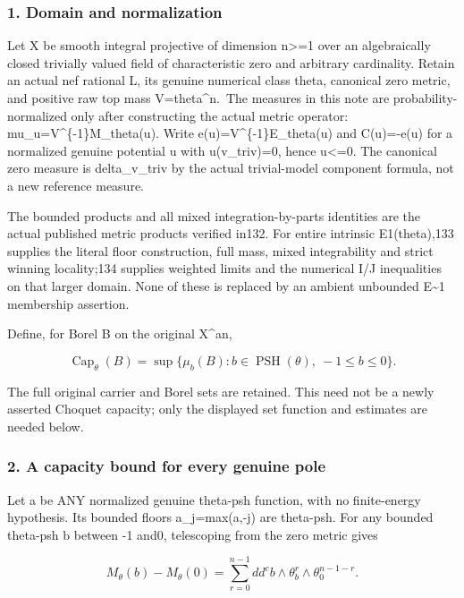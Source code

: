 \documentclass[
]{article}
\begin{document}
\subsubsection{1. Domain and
normalization}\label{domain-and-normalization}

Let X be smooth integral projective of dimension n\textgreater=1 over an
algebraically closed trivially valued field of characteristic zero and
arbitrary cardinality. Retain an actual nef rational L, its genuine
numerical class theta, canonical zero metric, and positive raw top mass
V=theta\^{}n.~The measures in this note are probability-normalized only
after constructing the actual metric operator:
mu\_u=V\^{}\{-1\}M\_theta(u). Write e(u)=V\^{}\{-1\}E\_theta(u) and
C(u)=-e(u) for a normalized genuine potential u with u(v\_triv)=0, hence
u\textless=0. The canonical zero measure is delta\_v\_triv by the actual
trivial-model component formula, not a new reference measure.

The bounded products and all mixed integration-by-parts identities are
the actual published metric products verified in132. For entire
intrinsic E1(theta),133 supplies the literal floor construction, full
mass, mixed integrability and strict winning locality;134 supplies
weighted limits and the numerical I/J inequalities on that larger
domain. None of these is replaced by an ambient unbounded
E\textasciitilde1 membership assertion.

Define, for Borel B on the original X\^{}an,

\[\operatorname{Cap}_\theta(B)=\sup\{\mu_b(B):b\in\operatorname{PSH}(\theta),\ -1\leq b\leq0\}.\]

The full original carrier and Borel sets are retained. This need not be
a newly asserted Choquet capacity; only the displayed set function and
estimates are needed below.

\subsubsection{2. A capacity bound for every genuine
pole}\label{a-capacity-bound-for-every-genuine-pole}

Let a be ANY normalized genuine theta-psh function, with no
finite-energy hypothesis. Its bounded floors a\_j=max(a,-j) are
theta-psh. For any bounded theta-psh b between -1 and0, telescoping from
the zero metric gives

\[M_\theta(b)-M_\theta(0)=\sum_{r=0}^{n-1}dd^c b\wedge\theta_b^r\wedge\theta_0^{n-1-r}.\]
\end{document}
